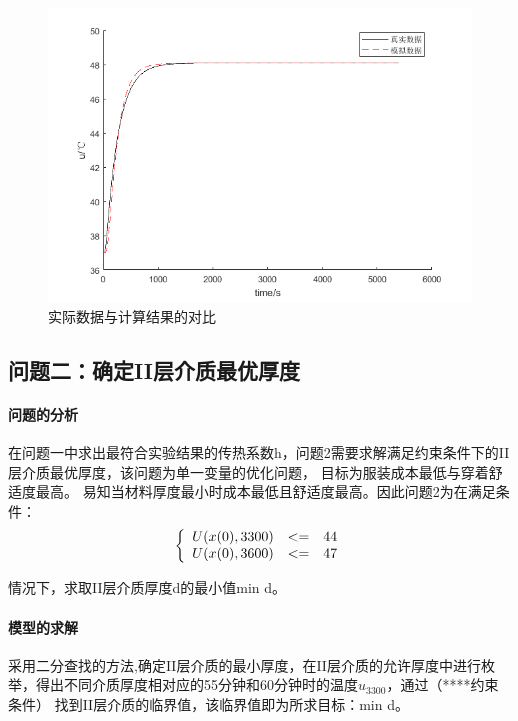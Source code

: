 \documentclass{cumcmthesis}
\begin{document}
        \begin{figure}[h] 
            \centering 
            \includegraphics[scale=0.9]{../figure/ques1result.png} 
            \caption{实际数据与计算结果的对比}\label{cou}    
        \end{figure}


    \subsection{问题二：确定II层介质最优厚度} 
        \paragraph{问题的分析} 
       
        
     在问题一中求出最符合实验结果的传热系数h，问题2需要求解满足约束条件下的II层介质最优厚度，该问题为单一变量的优化问题，
     目标为服装成本最低与穿着舒适度最高。
    易知当材料厚度最小时成本最低且舒适度最高。因此问题2为在满足条件：
        $$
        \left \{
        \begin{array}{r c l}
        U(x(0),3300)    & <= &  44 \\
        U(x(0),3600)    & <= &  47 \\
        \end{array}
        \right .
        $$
    

    情况下，求取II层介质厚度d的最小值min d。
        \paragraph{模型的求解}
        采用二分查找的方法,确定II层介质的最小厚度，在II层介质的允许厚度中进行枚举，得出不同介质厚度相对应的55分钟和60分钟时的温度\(u_{3300}\)，通过（****约束条件）
    找到II层介质的临界值，该临界值即为所求目标：min d。
\end{document}
